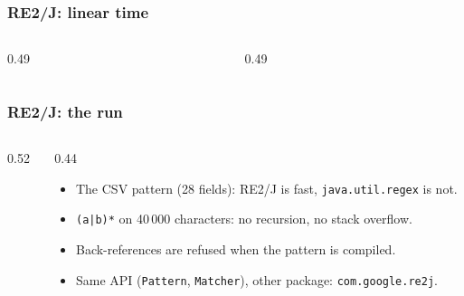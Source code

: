 \documentclass[aspectratio=169,10pt,compress]{beamer}
\begin{document}
\begin{frame}[t,fragile] \frametitle{RE2/J: linear time}
  \begin{columns}[T]
    \begin{column}{0.49\textwidth}
    \end{column}
    \begin{column}{0.49\textwidth}
    \end{column}
  \end{columns}
\end{frame}




\begin{frame}[t,fragile] \frametitle{RE2/J: the run}
  \begin{columns}[T]
    \begin{column}{0.52\textwidth}
    \end{column}
    \begin{column}{0.44\textwidth}
      \begin{itemize}\small
        \item The CSV pattern (28 fields): RE2/J is fast, \texttt{java.util.regex} is not.
        \item \texttt{(a|b)*} on 40\,000 characters: no recursion, no stack overflow.
        \item Back-references are refused when the pattern is compiled.
        \item Same API (\texttt{Pattern}, \texttt{Matcher}), other package: \texttt{com.google.re2j}.
      \end{itemize}
    \end{column}
  \end{columns}
\end{frame}
\end{document}
